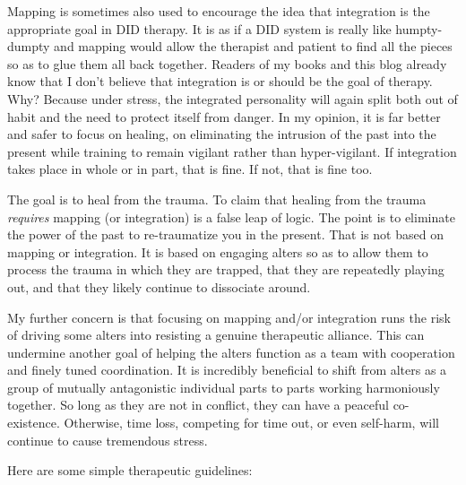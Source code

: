 \documentclass[]{book}
\begin{document}
Mapping is sometimes also used to encourage the idea that integration is the appropriate goal in DID therapy. It is as if a DID system is really like humpty-dumpty and mapping would allow the therapist and patient to find all the pieces so as to glue them all back together. Readers of my books and this blog already know that I don't believe that integration is or should be the goal of therapy. Why? Because under stress, the integrated personality will again split both out of habit and the need to protect itself from danger. In my opinion, it is far better and safer to focus on healing, on eliminating the intrusion of the past into the present while training to remain vigilant rather than hyper-vigilant. If integration takes place in whole or in part, that is fine. If not, that is fine too.

The goal is to heal from the trauma. To claim that healing from the trauma \emph{requires} mapping (or integration) is a false leap of logic. The point is to eliminate the power of the past to re-traumatize you in the present. That is not based on mapping or integration. It is based on engaging alters so as to allow them to process the trauma in which they are trapped, that they are repeatedly playing out, and that they likely continue to dissociate around.

My further concern is that focusing on mapping and/or integration runs the risk of driving some alters into resisting a genuine therapeutic alliance. This can undermine another goal of helping the alters function as a team with cooperation and finely tuned coordination. It is incredibly beneficial to shift from alters as a group of mutually antagonistic individual parts to parts working harmoniously together. So long as they are not in conflict, they can have a peaceful co-existence. Otherwise, time loss, competing for time out, or even self-harm, will continue to cause tremendous stress.

Here are some simple therapeutic guidelines:
\end{document}
